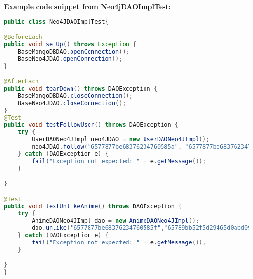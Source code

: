 \textbf{Example code snippet from Neo4jDAOImplTest:}
\begin{mdframed}[backgroundcolor=yellow!20, innerleftmargin=10pt, innerrightmargin=10pt]
    \begin{lstlisting}[language=java]
public class Neo4JDAOImplTest{

@BeforeEach
public void setUp() throws Exception {
    BaseMongoDBDAO.openConnection();
    BaseNeo4JDAO.openConnection();
}

@AfterEach
public void tearDown() throws DAOException {
    BaseMongoDBDAO.closeConnection();
    BaseNeo4JDAO.closeConnection();
}
@Test
public void testFollowUser() throws DAOException {
    try {
        UserDAONeo4JImpl neo4JDAO = new UserDAONeo4JImpl();
        neo4JDAO.follow("6577877be68376234760585a", "6577877be683762347605859");
    } catch (DAOException e) {
        fail("Exception not expected: " + e.getMessage());
    }

}

@Test
public void testUnlikeAnime() throws DAOException {
    try {
        AnimeDAONeo4JImpl dao = new AnimeDAONeo4JImpl();
        dao.unlike("6577877be68376234760585f","65789bb52f5d29465d0abd09");
    } catch (DAOException e) {
        fail("Exception not expected: " + e.getMessage());
    }

}
}
    \end{lstlisting}
\end{mdframed}


